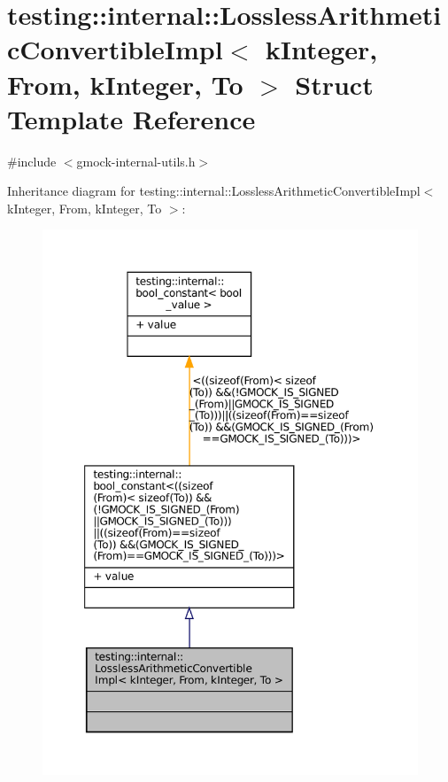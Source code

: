\hypertarget{structtesting_1_1internal_1_1LosslessArithmeticConvertibleImpl_3_01kInteger_00_01From_00_01kInteger_00_01To_01_4}{}\section{testing\+:\+:internal\+:\+:Lossless\+Arithmetic\+Convertible\+Impl$<$ k\+Integer, From, k\+Integer, To $>$ Struct Template Reference}
\label{structtesting_1_1internal_1_1LosslessArithmeticConvertibleImpl_3_01kInteger_00_01From_00_01kInteger_00_01To_01_4}


{\ttfamily \#include $<$gmock-\/internal-\/utils.\+h$>$}



Inheritance diagram for testing\+:\+:internal\+:\+:Lossless\+Arithmetic\+Convertible\+Impl$<$ k\+Integer, From, k\+Integer, To $>$\+:
\nopagebreak
\begin{figure}[H]
\begin{center}
\leavevmode
\includegraphics[width=350pt]{structtesting_1_1internal_1_1LosslessArithmeticConvertibleImpl_3_01kInteger_00_01From_00_01kInteedfb9e0d2309d16fae2503c192fdc7a4}
\end{center}
\end{figure}



